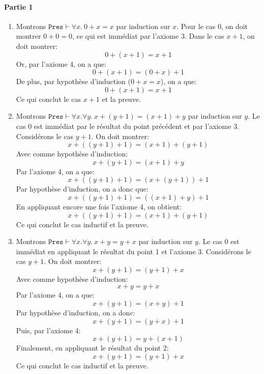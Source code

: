 \documentclass[12pt,french,a4paper]{article}
\begin{document}
\newpage

\begin{question}

\paragraph{Partie 1}

\begin{enumerate}
\item Montrons $\texttt{Pres} \vdash \forall x.\ 0 + x = x$ par induction sur $x$. Pour le cas $0$, on doit montrer $0 + 0 = 0$, ce qui est immédiat par l'axiome 3. Dans le cas $x + 1$, on doit montrer:
\[
0 + (x + 1) = x + 1
\]
Or, par l'axiome 4, on a que:
\[
0 + (x + 1) = (0 + x) + 1
\]
De plus, par hypothèse d'induction ($0 + x = x$), on a que:
\[
0 + (x + 1) = x + 1
\]
Ce qui conclut le cas $x + 1$ et la preuve.
\item Montrons $\texttt{Pres} \vdash \forall x. \forall y.\ x + (y + 1) = (x + 1) + y$ par induction sur $y$.
Le cas $0$ est immédiat par le résultat du point précédent et par l'axiome 3.
Considérons le cas $y + 1$. On doit montrer:
\[
x + ((y + 1) + 1) = (x + 1) + (y + 1)
\]
Avec comme hypothèse d'induction:
\[
x + (y + 1) = (x + 1) + y
\]
Par l'axiome 4, on a que:
\[
x + ((y + 1) + 1) = (x + (y + 1)) + 1
\]
Par hypothèse d'induction, on a donc que:
\[
x + ((y + 1) + 1) = ((x + 1) + y) + 1
\]
En appliquant encore une fois l'axiome 4, on obtient:
\[
x + ((y + 1) + 1) = (x + 1) + (y + 1)
\]
Ce qui conclut le cas inductif et la preuve.
\item Montrons $\texttt{Pres} \vdash \forall x. \forall y.\ x + y = y + x$ par induction sur $y$.
Le cas $0$ est immédiat en appliquant le résultat du point 1 et l'axiome 3.
Considérons le cas $y + 1$. On doit montrer:
\[
x + (y + 1) = (y + 1) + x
\]
Avec comme hypothèse d'induction:
\[
x + y = y + x
\]
Par l'axiome 4, on a que:
\[
x + (y + 1) = (x + y) + 1
\]
Par hypothèse d'induction, on a donc:
\[
x + (y + 1) = (y + x) + 1
\]
Puis, par l'axiome 4:
\[
x + (y + 1) = y + (x + 1)
\]
Finalement, en appliquant le résultat du point 2:
\[
x + (y + 1) = (y + 1) + x
\]
Ce qui conclut le cas inductif et la preuve.
\end{enumerate}

\end{question}
\end{document}
